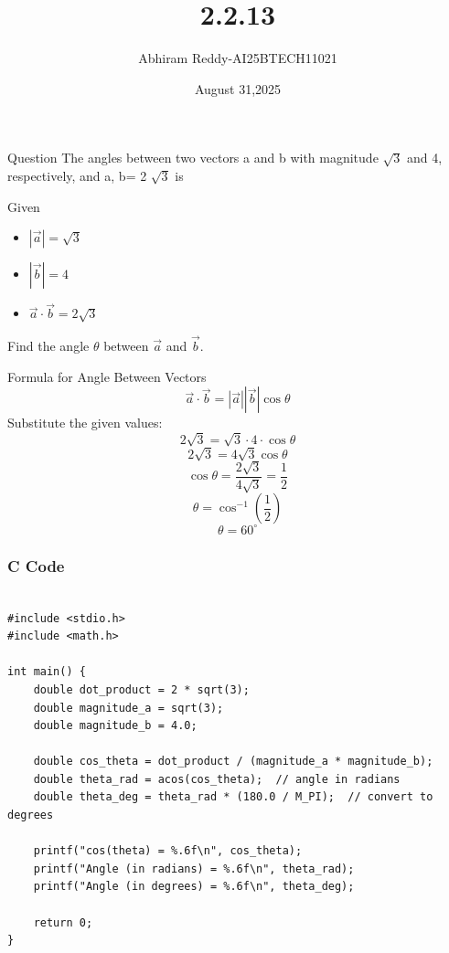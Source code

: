 \documentclass{beamer}
\title 
{2.2.13}
\date{August 31,2025}
\author 
{Abhiram Reddy-AI25BTECH11021}
\begin{document}
\frame{\titlepage}
\begin{frame}{Question}
The angles between
two vectors a and b with magnitude
$\sqrt{3}$ and 4, respectively,
and a, b= 2 $\sqrt{3}$ is

\end{frame}



\begin{frame}{Given}
\begin{itemize}
    \item \( |\vec{a}| = \sqrt{3} \)
    \item \( |\vec{b}| = 4 \)
    \item \( \vec{a} \cdot \vec{b} = 2\sqrt{3} \)
\end{itemize}
Find the angle \( \theta \) between \( \vec{a} \) and \( \vec{b} \).
\end{frame}

\begin{frame}{Formula for Angle Between Vectors}
\[
\vec{a} \cdot \vec{b} = |\vec{a}| |\vec{b}| \cos\theta
\]
Substitute the given values:
\[
2\sqrt{3} = \sqrt{3} \cdot 4 \cdot \cos\theta
\]
\[
2\sqrt{3} = 4\sqrt{3} \cos\theta
\]
\[
\cos\theta = \frac{2\sqrt{3}}{4\sqrt{3}} = \frac{1}{2}
\]
\[
\theta = \cos^{-1}\left( \frac{1}{2} \right)
\]
\[
\boxed{ \theta = 60^\circ }
\]
\end{frame}



\begin{frame}[fragile]
    \frametitle{C Code }

    \begin{lstlisting}

#include <stdio.h>
#include <math.h>

int main() {
    double dot_product = 2 * sqrt(3);
    double magnitude_a = sqrt(3);
    double magnitude_b = 4.0;

    double cos_theta = dot_product / (magnitude_a * magnitude_b);
    double theta_rad = acos(cos_theta);  // angle in radians
    double theta_deg = theta_rad * (180.0 / M_PI);  // convert to degrees

    printf("cos(theta) = %.6f\n", cos_theta);
    printf("Angle (in radians) = %.6f\n", theta_rad);
    printf("Angle (in degrees) = %.6f\n", theta_deg);

    return 0;
}


    \end{lstlisting}
\end{frame}
\end{document}
